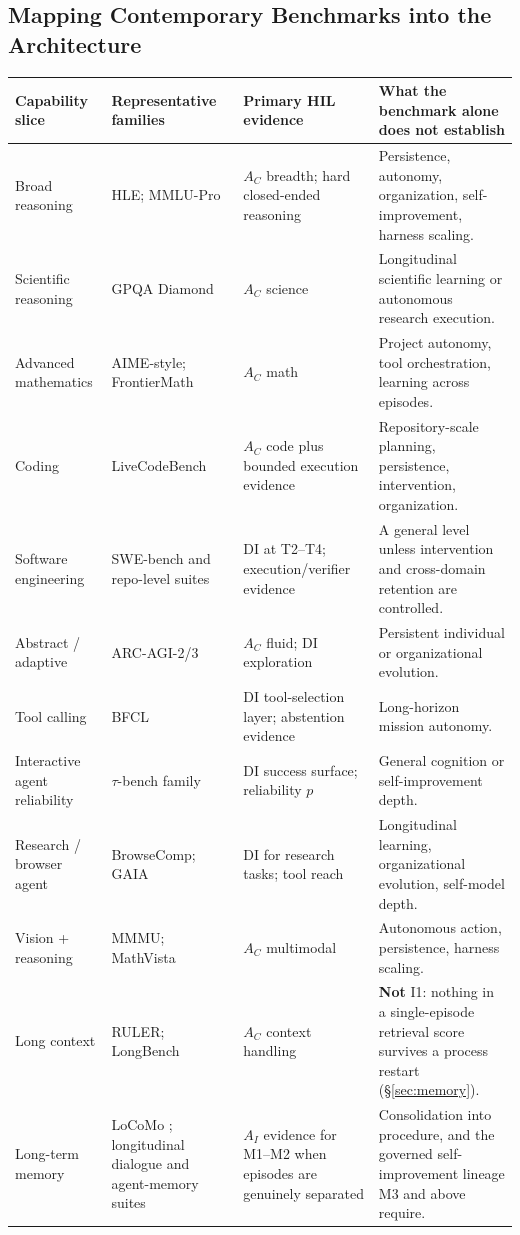 \documentclass[11pt]{article}
\theoremstyle{definition}
\begin{document}
\subsection{Mapping Contemporary Benchmarks into the Architecture}

\begin{table}[h]
\centering\scriptsize
\begin{tabularx}{\textwidth}{@{}lZZZ@{}}
\toprule
Capability slice & Representative families & Primary HIL evidence & What the benchmark alone does not establish \\
\midrule
Broad reasoning & HLE; MMLU-Pro & $A_C$ breadth; hard closed-ended reasoning & Persistence, autonomy, organization, self-improvement, harness scaling. \\
Scientific reasoning & GPQA Diamond & $A_C$ science & Longitudinal scientific learning or autonomous research execution. \\
Advanced mathematics & AIME-style; FrontierMath & $A_C$ math & Project autonomy, tool orchestration, learning across episodes. \\
Coding & LiveCodeBench & $A_C$ code plus bounded execution evidence & Repository-scale planning, persistence, intervention, organization. \\
Software engineering & SWE-bench and repo-level suites & DI at T2--T4; execution/verifier evidence & A general level unless intervention and cross-domain retention are controlled. \\
Abstract / adaptive & ARC-AGI-2/3 & $A_C$ fluid; DI exploration & Persistent individual or organizational evolution. \\
Tool calling & BFCL & DI tool-selection layer; abstention evidence & Long-horizon mission autonomy. \\
Interactive agent reliability & $\tau$-bench family & DI success surface; reliability $p$ & General cognition or self-improvement depth. \\
Research / browser agent & BrowseComp; GAIA & DI for research tasks; tool reach & Longitudinal learning, organizational evolution, self-model depth. \\
Vision + reasoning & MMMU; MathVista & $A_C$ multimodal & Autonomous action, persistence, harness scaling. \\
Long context & RULER; LongBench & $A_C$ context handling & \textbf{Not} I1: nothing in a single-episode retrieval score survives a process restart (\S\ref{sec:memory}). \\
Long-term memory & LoCoMo \citep{maharana2024locomo}; longitudinal dialogue and agent-memory suites & $A_I$ evidence for M1--M2 when episodes are genuinely separated & Consolidation into procedure, and the governed self-improvement lineage M3 and above require. \\

\end{tabularx}
\end{table}
\end{document}

